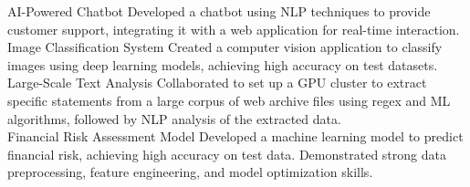 \documentclass[9pt,a4paper,ragged2e,withhyper]{altacv}
\begin{document}
\begin{paracol}{2}
        \cvevent
            { AI-Powered Chatbot }
            {  }
            {}
            {}
        Developed a chatbot using NLP techniques to provide customer support, integrating it with a web application for real-time interaction.\\
        \vspace{0.5em}
        \cvevent
            { Image Classification System }
            {  }
            {}
            {}
        Created a computer vision application to classify images using deep learning models, achieving high accuracy on test datasets.\\
        \vspace{0.5em}
        \cvevent
            { Large-Scale Text Analysis }
            {  }
            {}
            {}
        Collaborated to set up a GPU cluster to extract specific statements from a large corpus of web archive files using regex and ML algorithms, followed by NLP analysis of the extracted data.\\
        \vspace{0.5em}
        \cvevent
            { Financial Risk Assessment Model }
            {  }
            {}
            {}
        Developed a machine learning model to predict financial risk, achieving high accuracy on test data. Demonstrated strong data preprocessing, feature engineering, and model optimization skills.\\
        \vspace{0.5em}

        
    \end{paracol}
\end{document}
